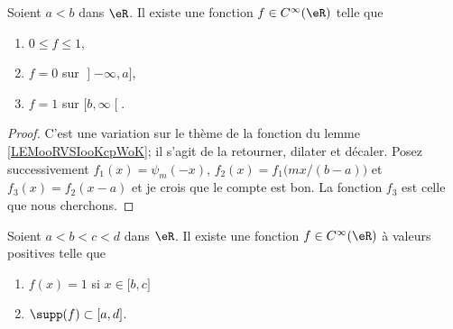 \begin{lemma}     \label{LEMooFFPVooDKGUAp}
	Soient \( a<b\) dans \( \eR\). Il existe une fonction \( f\in  C^{\infty}(\eR)\) telle que
	\begin{enumerate}
		\item
		      \( 0\leq f\leq 1\),
		\item
		      \( f=0\) sur \( \mathopen] -\infty , a \mathclose]\),
		\item
		      \( f=1\) sur \( \mathopen[ b , \infty \mathclose[\).
	\end{enumerate}
\end{lemma}

\begin{proof}
	C'est une variation sur le thème de la fonction du lemme \ref{LEMooRVSIooKcpWoK}; il s'agit de la retourner, dilater et décaler. Posez successivement \( f_1(x)=\psi_m(-x)\), \( f_2(x)=f_1\big(mx/(b-a)\big)\) et \( f_3(x)=f_2(x-a)\) et je crois que le compte est bon. La fonction \( f_3\) est celle que nous cherchons.
\end{proof}

\begin{proposition}     \label{PROPooAZJZooTYWjzb}
	Soient \( a<b<c<d\) dans \( \eR\). Il existe une fonction \( f\in C^{\infty}(\eR)\) à valeurs positives telle que
	\begin{enumerate}
		\item
		      \( f(x)=1\) si \( x\in\mathopen[ b , c \mathclose]\)
		\item
		      \( \supp(f)\subset\mathopen[ a , d \mathclose]\).
	\end{enumerate}
\end{proposition}

